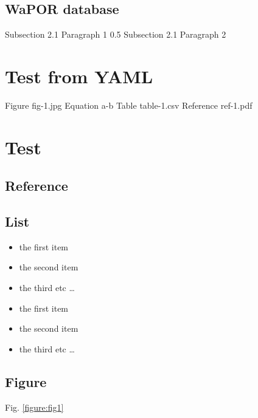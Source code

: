 \documentclass{article}%
\begin{document}
\subsection{WaPOR database}%
\label{subsec:WaPORdatabase}%
Subsection 2.1 Paragraph 1 0.5%
\linebreak%
Subsection 2.1 Paragraph 2%
\linebreak

%
\newpage%
\RaggedRight%
\section{Test from YAML}%
\label{sec:TestfromYAML}%
Figure fig{-}1.jpg%
\linebreak%
Equation a{-}b%
\linebreak%
Table table{-}1.csv%
\linebreak%
Reference ref{-}1.pdf%
\linebreak

%
\newpage%
\section{Test}%
\label{sec:Test}%
\subsection{Reference}%
\label{subsec:Reference}%
\cite{bertram}%
\linebreak%
\cite{simon06}%
\linebreak

%
\subsection{List}%
\label{subsec:List}%
\begin{itemize}%
\item%
the first item%
\item%
the second item%
\item%
the third etc%
\ldots%
\end{itemize}%
\begin{itemize}%
\item%
the first item%
\item%
the second item%
\item%
the third etc%
\ldots%
\end{itemize}

%
\subsection{Figure}%
\label{subsec:Figure}%
Fig. \ref{figure:fig1}%
\end{document}
